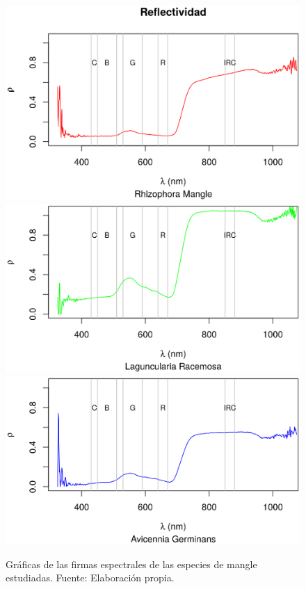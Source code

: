 \begin{figure}
	\centering
	\includegraphics[width=0.8\linewidth]{./Imagenes/RM.eps}
	\includegraphics[width=0.8\linewidth]{./Imagenes/LR.eps}
	\includegraphics[width=0.8\linewidth]{./Imagenes/AG.eps}
	\caption[Firmas espectrales]{Gráficas de las firmas espectrales de las especies de mangle estudiadas. Fuente: Elaboración propia.}
	\label{fig:firmas_espectrales}
\end{figure}

